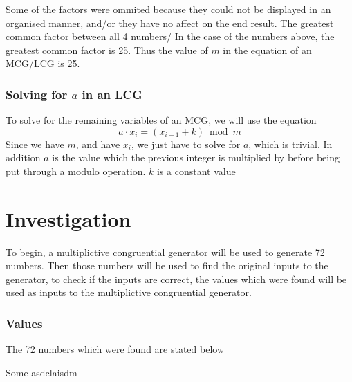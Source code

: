 \documentclass[12pft, english]{article}
\begin{document}
\begin{multicols}{2}
  Some of the factors were ommited because they could not be displayed in an organised manner, and/or they have no affect on the end result. The greatest common factor between all 4 numbers/
  In the case of the numbers above, the greatest common factor is 25. Thus the value of \(m\) in the equation of an MCG/LCG is 25.

  \subsubsection{Solving for \(a\) in an LCG}
  To solve for the remaining variables of an MCG, we will use the equation
  \[a \cdot x_{i} = (x_{i-1} + k) \bmod m\]
  Since we have \(m\), and have \(x_{i}\), we just have to solve for \(a\), which is trivial. In addition \(a\) is the value which the previous integer is multiplied by before being put through a modulo operation. \(k\) is a constant value

  \section{Investigation}
  To begin, a multiplictive congruential generator will be used to generate 72 numbers. Then those numbers will be used to find the original inputs to the generator, to check if the inputs are correct, the values which were found will be used as inputs to the multiplictive congruential generator.
  \subsubsection{Values}
  The 72 numbers which were found are stated below \\

\end{multicols}

Some asdclaisdm \citep{example}

\citet{waterlooMCG}

\citet{whack}



\end{document}
